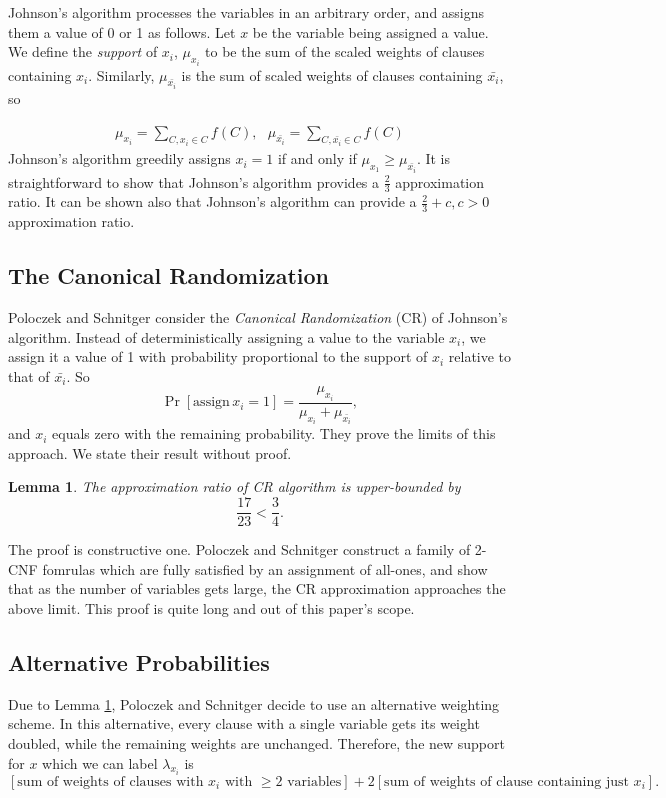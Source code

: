 \documentclass[11pt,letter]{article}
\newtheorem{lemma}[theorem]{Lemma}
\numberwithin{theorem}{section}
\begin{document}
Johnson's algorithm processes the variables in an arbitrary order, and assigns them a value of 0 or 1 as follows. Let $x$ be the variable being assigned a value. We define the \emph{support} of $x_i$, $\mu_{x_i}$ to be the sum of the scaled weights of clauses containing $x_i$. Similarly, $\mu_{\bar{x_i}}$ is the sum of scaled weights of clauses containing $\bar{x_i}$, so

\begin{align*}
\mu_{x_i} = \sum_{C,x_i \in C}f(C), \,\,\,\, \mu_{\bar{x_i}} =\sum_{C,\bar{x_i}\in C}f(C)
\end{align*}
Johnson's algorithm greedily assigns $x_i =1$ if and only if $\mu_{x_1} \ge \mu_{\bar{x_i}}$. It is straightforward to show that Johnson's algorithm provides a $\frac{2}{3}$ approximation ratio. It can be shown also that Johnson's algorithm can provide a $\frac{2}{3} + c, c>0$ approximation ratio.

\subsection*{The Canonical Randomization}
Poloczek and Schnitger consider the \emph{Canonical Randomization} (CR) of Johnson's algorithm. Instead of deterministically assigning a value to the variable $x_i$, we assign it a value of 1 with probability proportional to the support of $x_i$ relative to that of $\bar{x_i}$. So
\[\Pr[\mathrm{assign }\, x_i=1] = \frac{\mu_{x_i}}{\mu_{x_i} + \mu_{\bar{x_i}}},\] and $x_i$ equals zero with the remaining probability. They prove the limits of this approach. We state their result without proof.

\begin{lemma}
\label{L:1}
The approximation ratio of CR algorithm is upper-bounded by
$$\frac{17}{23} < \frac{3}{4}.$$

\end{lemma}
The proof is constructive one. Poloczek and Schnitger construct a family of 2-CNF fomrulas which are fully satisfied by an assignment of all-ones, and show that as the number of variables gets large, the CR approximation approaches the above limit. This proof is quite long and out of this paper's scope.

\subsection*{Alternative Probabilities}
Due to Lemma \ref{L:1}, Poloczek and Schnitger decide to use an alternative weighting scheme. In this alternative, every clause with a single variable gets its weight doubled, while the remaining weights are unchanged. Therefore, the new support for $x$ which we can label $\lambda_{x_i}$ is
\[[\textrm{sum of weights of clauses with }x_i\textrm{ with }\ge 2\textrm{ variables}] + 2[\textrm{sum of weights of clause containing just }x_i].\]
\end{document}
